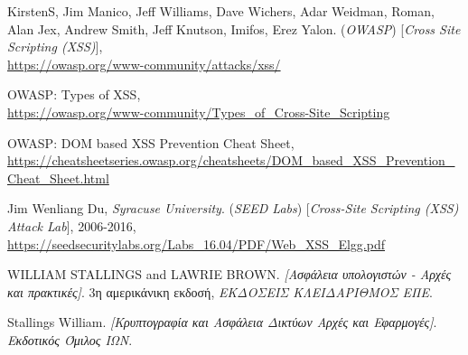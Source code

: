 \begin{thebibliography}{9}
KirstenS, Jim Manico, Jeff Williams, Dave Wichers, Adar Weidman, Roman, Alan Jex, Andrew Smith, Jeff Knutson, Imifos, Erez Yalon. (\textit{OWASP}) [\textit{Cross Site Scripting (XSS)}],\\ \url{https://owasp.org/www-community/attacks/xss/}{\color{black}}

OWASP: Types of XSS,\\ \url{https://owasp.org/www-community/Types_of_Cross-Site_Scripting}{\color{black}}

OWASP: DOM based XSS Prevention Cheat Sheet,\\ \url{https://cheatsheetseries.owasp.org/cheatsheets/DOM_based_XSS_Prevention_Cheat_Sheet.html}{\color{black}}

Jim Wenliang Du, \textit{Syracuse University}. (\textit{SEED Labs}) [\textit{Cross-Site Scripting (XSS) Attack Lab}], 2006-2016, \\ \url{https://seedsecuritylabs.org/Labs_16.04/PDF/Web_XSS_Elgg.pdf}{\color{black}}

WILLIAM STALLINGS and LAWRIE BROWN. 
\textit{[Ασφάλεια υπολογιστών - Αρχές και πρακτικές]}. 3η αμερικάνικη εκδοσή, 
\textit{ΕΚΔΟΣΕΙΣ ΚΛΕΙΔΑΡΙΘΜΟΣ ΕΠΕ}.

Stallings William. 
\textit{[Κρυπτογραφία και Ασφάλεια Δικτύων Αρχές και Εφαρμογές]}. 
\textit{Εκδοτικός Όμιλος ΙΩΝ}.

\end{thebibliography}